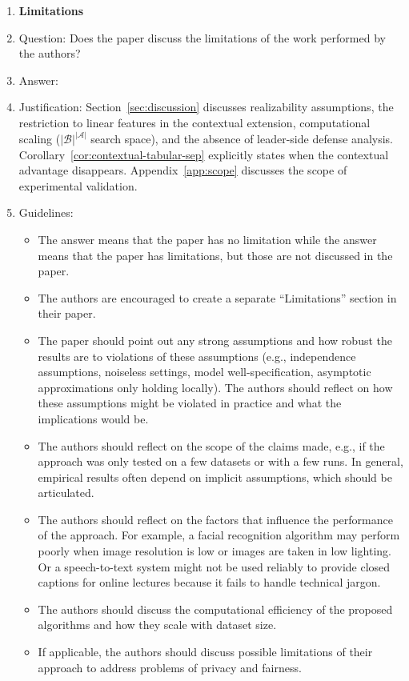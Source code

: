 \documentclass{article}
\newcommand{\cA}{\mathcal{A}}
\newcommand{\cB}{\mathcal{B}}
\begin{document}
\begin{enumerate}
\item {\bf Limitations}
    \item[] Question: Does the paper discuss the limitations of the work performed by the authors?
    \item[] Answer: \answerYes{}
    \item[] Justification: Section~\ref{sec:discussion} discusses realizability assumptions, the restriction to linear features in the contextual extension, computational scaling ($|\cB|^{|\cA|}$ search space), and the absence of leader-side defense analysis. Corollary~\ref{cor:contextual-tabular-sep} explicitly states when the contextual advantage disappears. Appendix~\ref{app:scope} discusses the scope of experimental validation.
    \item[] Guidelines:
    \begin{itemize}
        \item The answer \answerNA{} means that the paper has no limitation while the answer \answerNo{} means that the paper has limitations, but those are not discussed in the paper.
        \item The authors are encouraged to create a separate ``Limitations'' section in their paper.
        \item The paper should point out any strong assumptions and how robust the results are to violations of these assumptions (e.g., independence assumptions, noiseless settings, model well-specification, asymptotic approximations only holding locally). The authors should reflect on how these assumptions might be violated in practice and what the implications would be.
        \item The authors should reflect on the scope of the claims made, e.g., if the approach was only tested on a few datasets or with a few runs. In general, empirical results often depend on implicit assumptions, which should be articulated.
        \item The authors should reflect on the factors that influence the performance of the approach. For example, a facial recognition algorithm may perform poorly when image resolution is low or images are taken in low lighting. Or a speech-to-text system might not be used reliably to provide closed captions for online lectures because it fails to handle technical jargon.
        \item The authors should discuss the computational efficiency of the proposed algorithms and how they scale with dataset size.
        \item If applicable, the authors should discuss possible limitations of their approach to address problems of privacy and fairness.

\end{itemize}
\end{enumerate}
\end{document}
